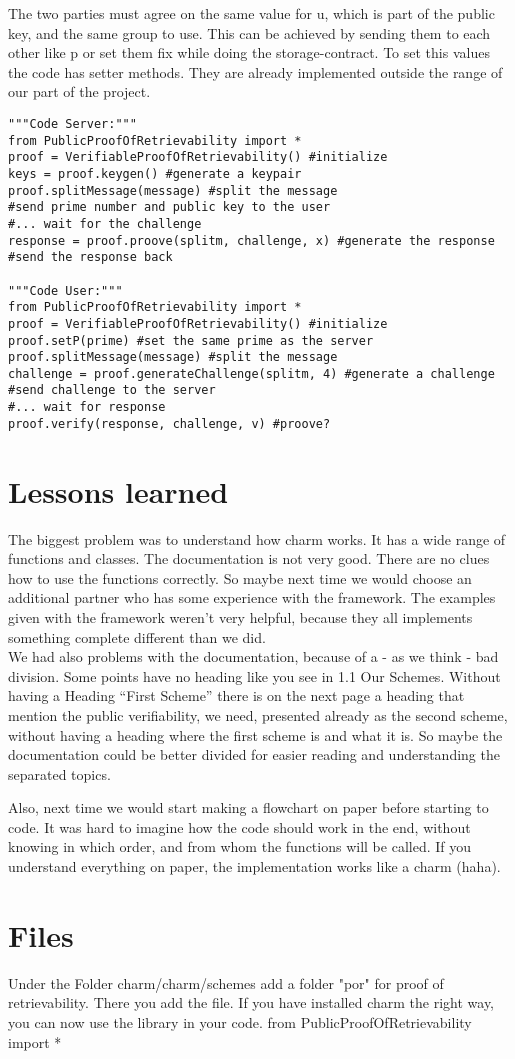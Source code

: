 \documentclass{amsart}
\begin{document}
The two parties must agree on the same value for u, which is part of the public key, and the same group to use. This can be achieved by sending them to each other like p or set them fix while doing the storage-contract. To set this values the code has setter methods. They are already implemented outside the range of our part of the project.
\lstset{
	breaklines=true,
	language=Python,
	frame=single,
	numbers=left,
	numbersep=5pt
}
\begin{lstlisting}[caption=How to Use the Code, label=one]
"""Code Server:"""
from PublicProofOfRetrievability import *
proof = VerifiableProofOfRetrievability() #initialize
keys = proof.keygen() #generate a keypair
proof.splitMessage(message) #split the message
#send prime number and public key to the user
#... wait for the challenge
response = proof.proove(splitm, challenge, x) #generate the response
#send the response back

"""Code User:"""
from PublicProofOfRetrievability import *
proof = VerifiableProofOfRetrievability() #initialize
proof.setP(prime) #set the same prime as the server
proof.splitMessage(message) #split the message
challenge = proof.generateChallenge(splitm, 4) #generate a challenge
#send challenge to the server
#... wait for response
proof.verify(response, challenge, v) #proove?
\end{lstlisting}

\section{Lessons learned}
The biggest problem was to understand how charm works. It has a wide range of functions and classes. The documentation is not very good. There are no clues how to use the functions correctly. So maybe next time we would choose an additional partner who has some experience with the framework. The examples given with the framework weren't very helpful, because they all implements something complete different than we did.\\
We had also problems with the documentation, because of a - as we think - bad division. Some points have no heading like you see in 1.1 Our Schemes. Without having a Heading "`First Scheme"' there is on the next page a heading that mention the public verifiability, we need, presented already as the second scheme, without having a heading where the first scheme is and what it is. So maybe the documentation could be better divided for easier reading and understanding the separated topics.


Also, next time we would start making a flowchart on paper before starting to code. It was hard to imagine how the code should work in the end, without knowing in which order, and from whom the functions will be called. If you understand everything on paper, the implementation works like a charm (haha).

\section{Files}
Under the Folder charm/charm/schemes add a folder "por" for proof of retrievability. There you add the file. If you have installed charm the right way, you can now use the library in your code.
from PublicProofOfRetrievability import *
\end{document}
